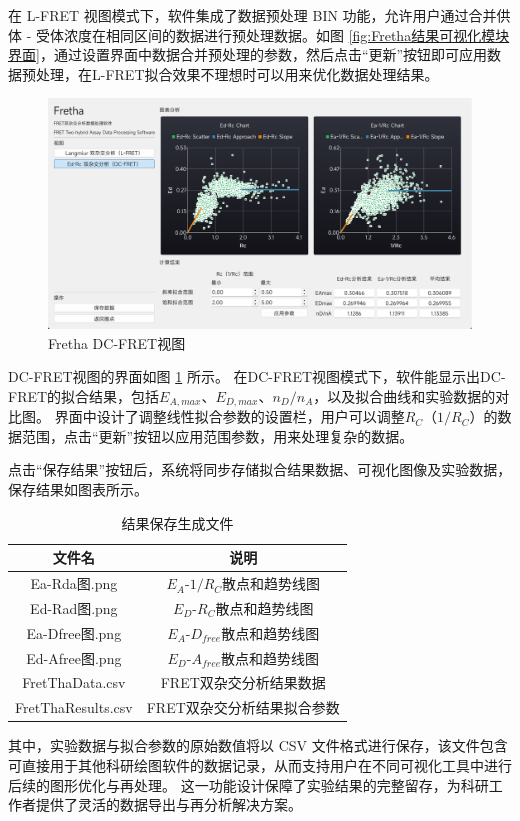 在 L-FRET 视图模式下，软件集成了数据预处理 BIN 功能，允许用户通过合并供体 - 受体浓度在相同区间的数据进行预处理数据。如图 \ref{fig:Fretha结果可视化模块界面}，通过设置界面中数据合并预处理的参数，然后点击“更新”按钮即可应用数据预处理，在L-FRET拟合效果不理想时可以用来优化数据处理结果。
\begin{figure}[htbp]
  \centering
  \includegraphics[width=0.9\linewidth]{../figures/2/2_DC-FRET结果界面.png}
  \caption{Fretha DC-FRET视图}
  \label{fig:fretha_dc_fret}
\end{figure}

DC-FRET视图的界面如图 \ref{fig:fretha_dc_fret} 所示。
在DC-FRET视图模式下，软件能显示出DC-FRET的拟合结果，包括$E_{A,max}$、$E_{D,max}$、$n_D/n_A$，以及拟合曲线和实验数据的对比图。
界面中设计了调整线性拟合参数的设置栏，用户可以调整$R_C$（$1/R_C$）的数据范围，点击“更新”按钮以应用范围参数，用来处理复杂的数据。

点击“保存结果”按钮后，系统将同步存储拟合结果数据、可视化图像及实验数据，保存结果如图表所示。
\begin{table}[htbp]
  \centering
  \caption{结果保存生成文件}
  \label{tab:fretha_result_list}
    \begin{tabular}{cc}
      \toprule[1.5pt]
      {文件名} & {说明} \\
      \midrule
      Ea-Rda图.png & $E_A$-$1/R_C$散点和趋势线图 \\
      Ed-Rad图.png & $E_D$-$R_C$散点和趋势线图 \\
      Ea-Dfree图.png & $E_A$-$D_{free}$散点和趋势线图 \\
      Ed-Afree图.png & $E_D$-$A_{free}$散点和趋势线图 \\
      FretThaData.csv & FRET双杂交分析结果数据 \\
      FretThaResults.csv & FRET双杂交分析结果拟合参数 \\
      \bottomrule[1.5pt]
    \end{tabular}
\end{table}
其中，实验数据与拟合参数的原始数值将以 CSV 文件格式进行保存，该文件包含可直接用于其他科研绘图软件的数据记录，从而支持用户在不同可视化工具中进行后续的图形优化与再处理。
这一功能设计保障了实验结果的完整留存，为科研工作者提供了灵活的数据导出与再分析解决方案。
\fi

